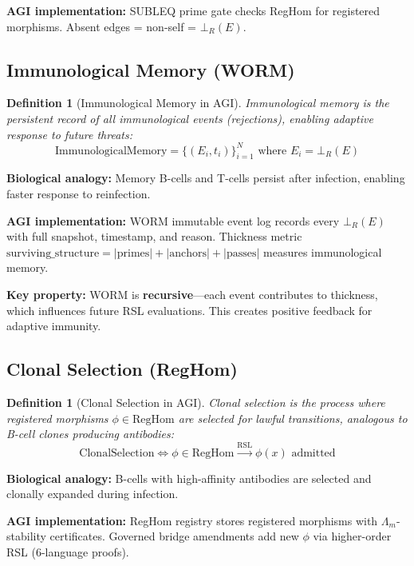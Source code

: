 \documentclass[11pt,a4paper]{article}
\newtheorem{definition}[theorem]{Definition}
\begin{document}
\textbf{AGI implementation:} SUBLEQ prime gate checks RegHom for registered morphisms. Absent edges = non-self = $\bot_R(E)$.

\subsection{Immunological Memory (WORM)}

\begin{definition}[Immunological Memory in AGI]
Immunological memory is the persistent record of all immunological events (rejections), enabling adaptive response to future threats:
\begin{equation}
\text{ImmunologicalMemory} = \{(E_i, t_i)\}_{i=1}^N \text{ where } E_i = \bot_R(E)
\end{equation}
\end{definition}

\textbf{Biological analogy:} Memory B-cells and T-cells persist after infection, enabling faster response to reinfection.

\textbf{AGI implementation:} WORM immutable event log records every $\bot_R(E)$ with full snapshot, timestamp, and reason. Thickness metric $\text{surviving\_structure} = |\text{primes}| + |\text{anchors}| + |\text{passes}|$ measures immunological memory.

\textbf{Key property:} WORM is \textbf{recursive}—each event contributes to thickness, which influences future RSL evaluations. This creates positive feedback for adaptive immunity.

\subsection{Clonal Selection (RegHom)}

\begin{definition}[Clonal Selection in AGI]
Clonal selection is the process where registered morphisms $\phi \in \text{RegHom}$ are selected for lawful transitions, analogous to B-cell clones producing antibodies:
\begin{equation}
\text{ClonalSelection} \iff \phi \in \text{RegHom} \xrightarrow{\text{RSL}} \phi(x) \text{ admitted}
\end{equation}
\end{definition}

\textbf{Biological analogy:} B-cells with high-affinity antibodies are selected and clonally expanded during infection.

\textbf{AGI implementation:} RegHom registry stores registered morphisms with $\Lambda_m$-stability certificates. Governed bridge amendments add new $\phi$ via higher-order RSL (6-language proofs).
\end{document}
